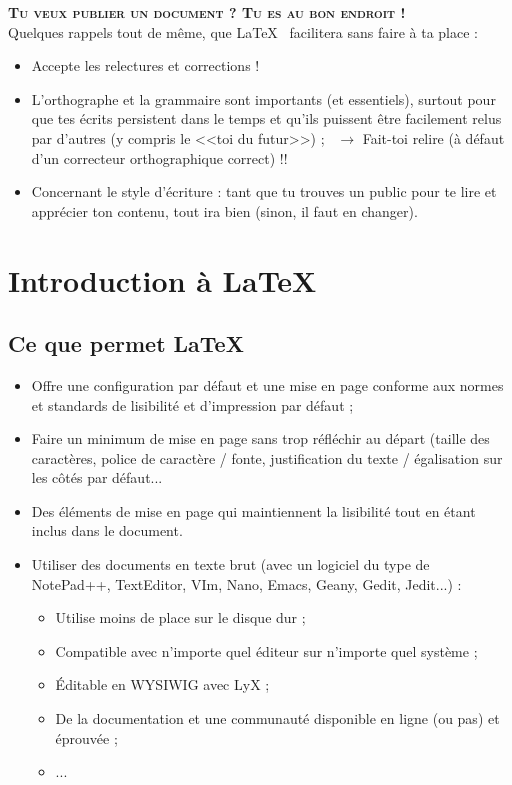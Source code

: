 \documentclass[11pt,twoside,a4paper]{article}
\begin{document}
\begin{landscape}
\begin{multicols}{2}
	\textbf{\textsc{Tu veux publier un document ? Tu es au bon endroit !}}~\\
	
	Quelques rappels tout de même, que \LaTeX~ facilitera sans faire à ta place : 
	\begin{itemize}
		\item Accepte les relectures et corrections !
		\item L'orthographe et la grammaire sont importants (et essentiels), surtout pour que tes écrits persistent dans le temps et qu'ils puissent être facilement relus par d'autres (y compris le <<toi du futur>>) ;~\newline
			$\rightarrow$ Fait-toi relire (à défaut d'un correcteur orthographique correct) !!
		\item Concernant le style d'écriture : tant que tu trouves un public pour te lire et apprécier ton contenu, tout ira bien (sinon, il faut en changer). 
	\end{itemize}

	
	\section{Introduction à \LaTeX}
	
	\subsection{Ce que permet \LaTeX}
	
	\begin{itemize}
		\item Offre une configuration par défaut et une mise en page conforme aux normes et standards de lisibilité et d'impression par défaut ; 
		\item Faire un minimum de mise en page sans trop réfléchir au départ (taille des caractères, police de caractère / fonte, justification du texte / égalisation sur les côtés par défaut...
		\item Des éléments de mise en page qui maintiennent la lisibilité tout en étant inclus dans le document. 
		\item Utiliser des documents en texte brut (avec un logiciel du type de NotePad++, TextEditor, VIm, Nano, Emacs, Geany, Gedit, Jedit...) : 
		\begin{itemize}
			\item Utilise moins de place sur le disque dur ; 
			\item Compatible avec n'importe quel éditeur sur n'importe quel système ; 
			\item Éditable en WYSIWIG avec LyX ; 
			\item De la documentation et une communauté disponible en ligne (ou pas) et éprouvée ; 
			\item ...
		\end{itemize}
	\end{itemize}


\end{multicols}
\end{landscape}
\end{document}
